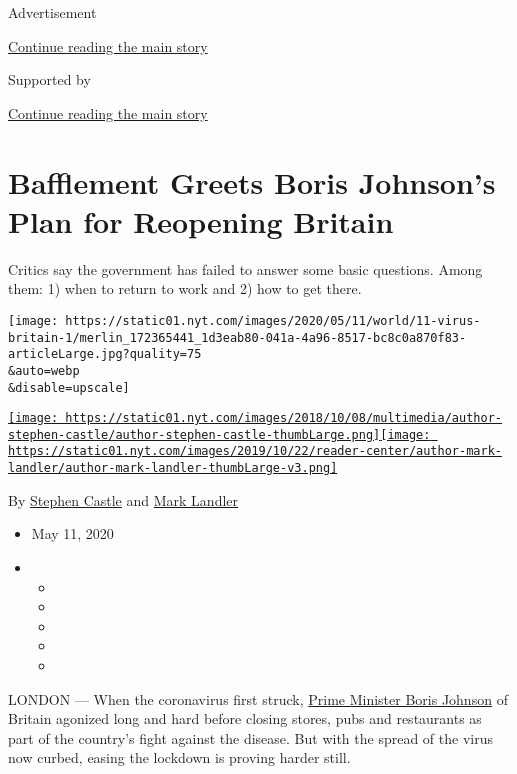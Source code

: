 Advertisement

\protect\hyperlink{after-top}{Continue reading the main story}

Supported by

\protect\hyperlink{after-sponsor}{Continue reading the main story}

\hypertarget{bafflement-greets-boris-johnsons-plan-for-reopening-britain}{%
\section{Bafflement Greets Boris Johnson's Plan for Reopening
Britain}\label{bafflement-greets-boris-johnsons-plan-for-reopening-britain}}

Critics say the government has failed to answer some basic questions.
Among them: 1) when to return to work and 2) how to get there.

\texttt{[image: https://static01.nyt.com/images/2020/05/11/world/11-virus-britain-1/merlin\_172365441\_1d3eab80-041a-4a96-8517-bc8c0a870f83-articleLarge.jpg?quality=75\\\&auto=webp\\\&disable=upscale]}

\href{https://www.nytimes.com/by/stephen-castle}{\texttt{[image: https://static01.nyt.com/images/2018/10/08/multimedia/author-stephen-castle/author-stephen-castle-thumbLarge.png]}}\href{https://www.nytimes.com/by/mark-landler}{\texttt{[image: https://static01.nyt.com/images/2019/10/22/reader-center/author-mark-landler/author-mark-landler-thumbLarge-v3.png]}}

By \href{https://www.nytimes.com/by/stephen-castle}{Stephen Castle} and
\href{https://www.nytimes.com/by/mark-landler}{Mark Landler}

\begin{itemize}
\item
  May 11, 2020
\item
  \begin{itemize}
  \item
  \item
  \item
  \item
  \item
  \end{itemize}
\end{itemize}

LONDON --- When the coronavirus first struck,
\href{https://www.nytimes.com/2020/05/12/podcasts/the-daily/boris-johnson-uk-coronavirus.html}{Prime
Minister Boris Johnson} of Britain agonized long and hard before closing
stores, pubs and restaurants as part of the country's fight against the
disease. But with the spread of the virus now curbed, easing the
lockdown is proving harder still.


